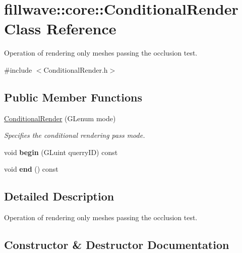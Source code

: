\hypertarget{classfillwave_1_1core_1_1ConditionalRender}{}\section{fillwave\+:\+:core\+:\+:Conditional\+Render Class Reference}
\label{classfillwave_1_1core_1_1ConditionalRender}


Operation of rendering only meshes passing the occlusion test.  




{\ttfamily \#include $<$Conditional\+Render.\+h$>$}

\subsection*{Public Member Functions}
\begin{DoxyCompactItemize}
\item 
\hyperlink{classfillwave_1_1core_1_1ConditionalRender_a405d055bd9b4d4833976f0a906af9df6}{Conditional\+Render} (G\+Lenum mode)
\begin{DoxyCompactList}\small\item\em Specifies the conditional rendering pass mode. \end{DoxyCompactList}\item 
\hypertarget{classfillwave_1_1core_1_1ConditionalRender_aacf61c7aaf67df8c082e14e1b89b2fd7}{}void {\bfseries begin} (G\+Luint querry\+I\+D) const \label{classfillwave_1_1core_1_1ConditionalRender_aacf61c7aaf67df8c082e14e1b89b2fd7}

\item 
\hypertarget{classfillwave_1_1core_1_1ConditionalRender_ab762ef963d26b38dbf165657918f6ae4}{}void {\bfseries end} () const \label{classfillwave_1_1core_1_1ConditionalRender_ab762ef963d26b38dbf165657918f6ae4}

\end{DoxyCompactItemize}


\subsection{Detailed Description}
Operation of rendering only meshes passing the occlusion test. 

\subsection{Constructor \& Destructor Documentation}
\hypertarget{classfillwave_1_1core_1_1ConditionalRender_a405d055bd9b4d4833976f0a906af9df6}{}
